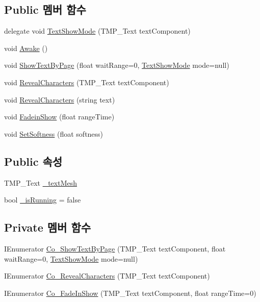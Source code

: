 \subsection*{Public 멤버 함수}
\begin{DoxyCompactItemize}
\item 
delegate void \mbox{\hyperlink{class_u_i_text_script_a0ecb940dec27ce92266d03cd4fd2042a}{Text\+Show\+Mode}} (T\+M\+P\+\_\+\+Text text\+Component)
\item 
void \mbox{\hyperlink{class_u_i_text_script_a5c785bc14de97738b65b70cd2e68d4f8}{Awake}} ()
\item 
void \mbox{\hyperlink{class_u_i_text_script_a97d0f33b8a4fcfee8143a79acd32b0d0}{Show\+Text\+By\+Page}} (float wait\+Range=0, \mbox{\hyperlink{class_u_i_text_script_a0ecb940dec27ce92266d03cd4fd2042a}{Text\+Show\+Mode}} mode=null)
\item 
void \mbox{\hyperlink{class_u_i_text_script_adfa2885d1c5654ce0a8da9fe0c5c15f8}{Reveal\+Characters}} (T\+M\+P\+\_\+\+Text text\+Component)
\item 
void \mbox{\hyperlink{class_u_i_text_script_a495e97bbed8219fa703953618f2948b8}{Reveal\+Characters}} (string text)
\item 
void \mbox{\hyperlink{class_u_i_text_script_a0843c4fe533a5d83147b106a496c84ef}{Fadein\+Show}} (float range\+Time)
\item 
void \mbox{\hyperlink{class_u_i_text_script_a5f00904260cbba5fb285ee9b9a04b1c2}{Set\+Softness}} (float softness)
\end{DoxyCompactItemize}
\subsection*{Public 속성}
\begin{DoxyCompactItemize}
\item 
T\+M\+P\+\_\+\+Text \mbox{\hyperlink{class_u_i_text_script_ac269c7294a861e6e87816d8257c6efc8}{\+\_\+text\+Mesh}}
\item 
bool \mbox{\hyperlink{class_u_i_text_script_af8a950f4500b100ffe89394102f2edbb}{\+\_\+is\+Running}} = false
\end{DoxyCompactItemize}
\subsection*{Private 멤버 함수}
\begin{DoxyCompactItemize}
\item 
I\+Enumerator \mbox{\hyperlink{class_u_i_text_script_a1e3858f90c3f9c061fd820c85968f1fb}{Co\+\_\+\+Show\+Text\+By\+Page}} (T\+M\+P\+\_\+\+Text text\+Component, float wait\+Range=0, \mbox{\hyperlink{class_u_i_text_script_a0ecb940dec27ce92266d03cd4fd2042a}{Text\+Show\+Mode}} mode=null)
\item 
I\+Enumerator \mbox{\hyperlink{class_u_i_text_script_a9f99020bcd0deb15ab7e88b42a1f8384}{Co\+\_\+\+Reveal\+Characters}} (T\+M\+P\+\_\+\+Text text\+Component)
\item 
I\+Enumerator \mbox{\hyperlink{class_u_i_text_script_a620cc6b3ee518d128bd07469889fb042}{Co\+\_\+\+Fade\+In\+Show}} (T\+M\+P\+\_\+\+Text text\+Component, float range\+Time=0)
\end{DoxyCompactItemize}


